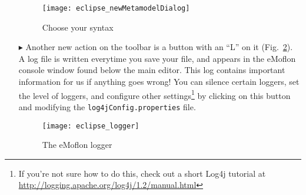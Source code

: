\begin{itemize}
\vspace{1cm}

\begin{figure}[htbp]
	\centering
  \texttt{[image: eclipse\_newMetamodelDialog]}
	\caption{Choose your syntax}
	\label{fig_chooseSyntax}
\end{figure} 

\vspace{1cm}

\item[$\blacktriangleright$]  Another new action on the toolbar is a button with an ``L'' on it (Fig.~\ref{fig_logger}). A log file is written everytime
you save your file, and appears in the eMoflon console window found below the main editor. This log contains important information for us if anything goes
wrong! You can silence certain loggers, set the level of loggers, and configure other settings\footnote{If you're not sure how to do this, check out a short
Log4j tutorial at \href{http://logging.apache.org/log4j/1.2/manual.html}{http://logging.apache.org/log4j/1.2/manual.html}} by clicking on this button and
modifying the \texttt{log4jConfig.properties} file.

\newpage
\vspace*{3cm}
\begin{figure}[htbp]
	\centering
  \texttt{[image: eclipse\_logger]}
	\caption{The eMoflon logger}
	\label{fig_logger}
\end{figure} 
\end{itemize}





